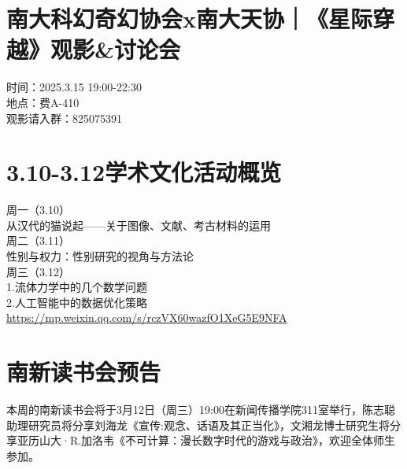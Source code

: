 \documentclass[letterpaper, 12pt]{article}
\begin{document}
\begin{multicols}{2}
\section{南大科幻奇幻协会x南大天协｜《星际穿越》观影\&讨论会}
时间：2025.3.15 19:00-22:30\\
地点：费A-410\\
观影请入群：825075391


\section{3.10-3.12学术文化活动概览}
周一（3.10）\\
从汉代的猫说起——关于图像、文献、考古材料的运用\\
周二（3.11）\\
性别与权力：性别研究的视角与方法论\\
周三（3.12）\\
1.流体力学中的几个数学问题\\
2.人工智能中的数据优化策略\\
\url{https://mp.weixin.qq.com/s/rczVX60wazfO1XeG5E9NFA}


\section{南新读书会预告}
本周的南新读书会将于3月12日（周三）19:00在新闻传播学院311室举行，陈志聪助理研究员将分享刘海龙《宣传:观念、话语及其正当化》，文湘龙博士研究生将分享亚历山大·R.加洛韦《不可计算：漫长数字时代的游戏与政治》，欢迎全体师生参加。


\end{multicols} 
\end{document}
